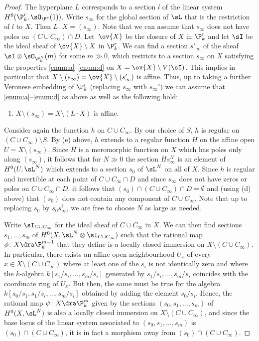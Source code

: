 \begin{proof}
The hyperplane $L$ corresponds to a section $l$ of the linear system
$H^0(\P^r_k, \sO_{\P^r}(1))$. Write $s_\infty$ for the global section of
$\sL$ that is the restriction of $l$ to $X$. Then $L\cdot X = (s_\infty)$.
Note that we can assume that $s_\infty$ does not have poles on
$(C\cup C_\infty) \cap D$.
Let~$\ov{X}$ be the closure of $X$ in $\P^r_k$ and let $\sI$ be the ideal
sheaf of $\ov{X} \setminus X$ in $\P^r_k$. We can find a section
$s'_{\infty}$ of the sheaf $\sI \otimes \sO_{\P^N_k}(m)$ for some
$m \gg 0$, which restricts to a section $s_{\infty}$ on $X$ satisfying
the properties \eqref{enum:a}--\eqref{enum:d} on $X = \ov{X} \setminus V(\sI)$.
This implies in particular that
$X \setminus (s_{\infty}) = \ov{X} \setminus (s'_{\infty})$
is affine. Thus, up to taking a further Veronese embedding of $\P^r_k$
(replacing $s_\infty$ with $s_\infty'$) we can assume that \eqref{enum:a}--\eqref{enum:d} as above as
well as the following hold:
\begin{enumerate}\renewcommand{\theenumi}{\alph{enumi}}
\setcounter{enumi}{4}
\item\label{enum:e}
$X \setminus (s_\infty) = X \setminus (L\cdot X)$ is affine.
\end{enumerate}

Consider again the function $h$ on $C \cup C_\infty$. By our choice of $S$,
$h$ is regular on $(C\cup C_\infty) \setminus S$. By (e) above, $h$ extends to a
regular function $H$ on the affine open $U = X \setminus (s_{\infty})$. Since
$H$ is a meromorphic function on $X$ which has poles only along
$(s_{\infty})$, it follows that for $N\gg 0$ the section $H s_\infty^N$ is an
element of $H^0(U, \sL^{N})$ which extends to a section $s_0$ of $\sL^N$
on all of $X$. Since $h$ is regular and invertible at each point of
$C\cup C_\infty \cap D$ and since $s_\infty$ does not have zeros or poles on
$C\cup C_\infty \cap D$, it follows that
$(s_0)\cap (C\cup C_\infty)\cap D = \emptyset$ and (using (d) above) that
$(s_0)$ does not contain any component of $C\cup C_\infty$. Note that up to
replacing $s_0$ by $s_0s_\infty^i$, we are free to choose $N$ as large as
needed.

Write $\sI_{C \cup C_\infty}$ for the ideal sheaf of $C\cup C_\infty$ in $X$. We
can then find sections $s_1,\ldots, s_m$ of
$H^0(X, \sL^{N} \otimes \sI_{C \cup C_\infty})$ such that the rational map
$\phi\colon X\dra \P^{m-1}_k$ that they define is a locally closed
immersion on $X\setminus (C\cup C_\infty)$. In particular, there exists an
affine open neighbourhood $U_x$ of every
$x\in X\setminus (C\cup C_\infty)$ where at least one of the $s_i$ is not
identically zero and where the $k$-algebra $k[s_1/s_i, \ldots, s_m/s_i]$
generated by $s_1/s_i, \ldots, s_m/s_i$ coincides with the coordinate ring of
$U_x$. But then, the same must be true for the algebra
$k[s_0/s_1, s_1/s_i, \ldots, s_m/s_i]$ obtained by adding the element
$s_0/s_i$. Hence, the rational map $\psi\colon X \dra \P^m_k$ given
by the sections $(s_0, s_1, \ldots, s_m)$ of $H^0(X, \sL^{N})$ is also a
locally closed immersion on $X\setminus (C\cup C_\infty)$, and since the base
locus of the linear system associated to $(s_0, s_1, \ldots, s_m)$ is
$(s_0)\cap (C\cup C_\infty)$, it is in fact a morphism away from
$(s_0) \cap (C\cup C_\infty)$.


\end{proof}
